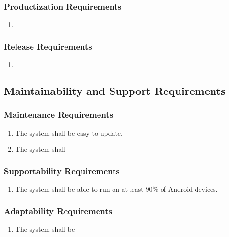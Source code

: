 \documentclass[titlepage]{article}
\begin{document}
\subsubsection{Productization Requirements}
\label{ssub:productization_requirements}
\begin{enumerate}[{OE}1. ]
	\item 
\end{enumerate}

\subsubsection{Release Requirements}
\label{ssub:release_requirements}
\begin{enumerate}[{OE}1. ]
	\item 
\end{enumerate}


\subsection{Maintainability and Support Requirements}
\label{sub:maintainability_and_support_requirements}
\subsubsection{Maintenance Requirements}
\label{ssub:maintenance_requirements}
\begin{enumerate}
	\item 
	The system shall be easy to update.
	\item
	The system shall 
\end{enumerate}

\subsubsection{Supportability Requirements}
\label{ssub:supportability_requirements}
\begin{enumerate}
	\item 
	The system shall be able to run on at least 90\% of Android devices.
\end{enumerate}

\subsubsection{Adaptability Requirements}
\label{ssub:adaptability_requirements}
\begin{enumerate}
\item
The system shall be 
\end{enumerate}
\end{document}
